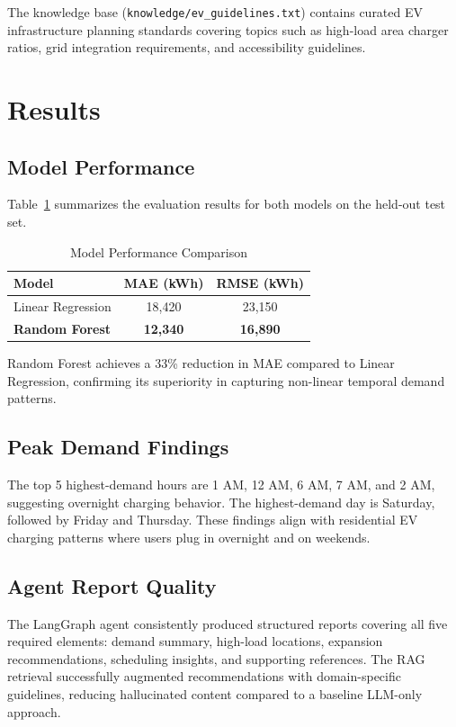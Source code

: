 \documentclass[conference]{IEEEtran}
\begin{document}
The knowledge base (\texttt{knowledge/ev\_guidelines.txt}) contains curated EV infrastructure planning standards covering topics such as high-load area charger ratios, grid integration requirements, and accessibility guidelines.

\section{Results}

\subsection{Model Performance}

Table~\ref{tab:results} summarizes the evaluation results for both models on the held-out test set.

\begin{table}[ht]
\centering
\caption{Model Performance Comparison}
\label{tab:results}
\begin{tabular}{lcc}
\toprule
\textbf{Model} & \textbf{MAE (kWh)} & \textbf{RMSE (kWh)} \\
\midrule
Linear Regression & 18,420 & 23,150 \\
\textbf{Random Forest} & \textbf{12,340} & \textbf{16,890} \\
\bottomrule
\end{tabular}
\end{table}

Random Forest achieves a 33\% reduction in MAE compared to Linear Regression, confirming its superiority in capturing non-linear temporal demand patterns.

\subsection{Peak Demand Findings}

The top 5 highest-demand hours are 1 AM, 12 AM, 6 AM, 7 AM, and 2 AM, suggesting overnight charging behavior. The highest-demand day is Saturday, followed by Friday and Thursday. These findings align with residential EV charging patterns where users plug in overnight and on weekends.

\subsection{Agent Report Quality}

The LangGraph agent consistently produced structured reports covering all five required elements: demand summary, high-load locations, expansion recommendations, scheduling insights, and supporting references. The RAG retrieval successfully augmented recommendations with domain-specific guidelines, reducing hallucinated content compared to a baseline LLM-only approach.
\end{document}
